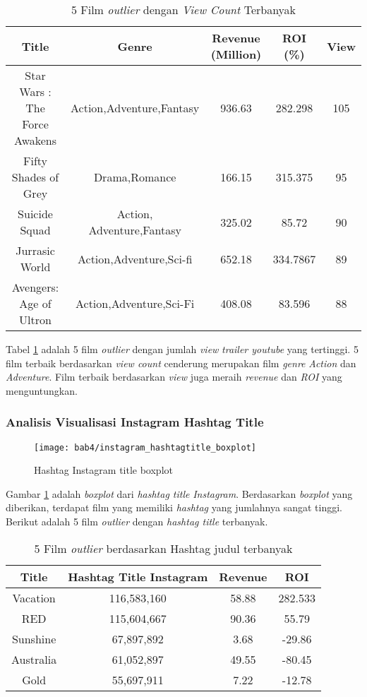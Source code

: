 \begin{table}[H]
\caption{5 Film \textit{outlier} dengan \textit{View Count} Terbanyak}
\centering
\begin{tabular}{|c|c|c|c|c|}
\hline 
Title & Genre & Revenue (Million) & ROI (\%) & View\\ 
\hline 
Star Wars : The Force Awakens  & Action,Adventure,Fantasy & 936.63 & 282.298 & 105 \\ 
\hline 
Fifty Shades of Grey & Drama,Romance & 166.15 & 315.375 & 	95 \\ 
\hline 
Suicide Squad & Action, Adventure,Fantasy & 325.02 & 85.72 &90 \\ 
\hline 
Jurrasic World & Action,Adventure,Sci-fi & 652.18 & 334.7867 &89 \\ 
\hline 
Avengers: Age of Ultron & Action,Adventure,Sci-Fi & 408.08 & 83.596 &88\\ 
\hline 
\end{tabular} 
\label{tab:5film_viewcountterbaik}
\end{table}
%
Tabel \ref{tab:5film_viewcountterbaik} adalah 5 film \textit{outlier} dengan jumlah \textit{view} \textit{trailer youtube} yang tertinggi. 5 film terbaik berdasarkan \textit{view count} cenderung merupakan film \textit{genre} \textit{Action} dan \textit{Adventure}. Film terbaik berdasarkan \textit{view} juga meraih \textit{revenue} dan \textit{ROI} yang menguntungkan.

\subsubsection{Analisis Visualisasi Instagram Hashtag Title}

\begin{figure}[H]
	\centering  
	\texttt{[image: bab4/instagram\_hashtagtitle\_boxplot]}   
	\caption{Hashtag Instagram title boxplot }
	\label{fig:instagram_hashtagtitle_boxplot} 
\end{figure} 

Gambar \ref{fig:instagram_hashtagtitle_boxplot} adalah \textit{boxplot} dari \textit{hashtag title} \textit{Instagram}. Berdasarkan \textit{boxplot} yang diberikan, terdapat film yang memiliki \textit{hashtag} yang jumlahnya sangat tinggi. Berikut adalah 5 film \textit{outlier} dengan \textit{hashtag title} terbanyak.

\begin{table}[H]
\caption{5 Film \textit{outlier} berdasarkan Hashtag judul terbanyak}
\centering
\begin{tabular}{|c|c|c|c|}
\hline 
Title & Hashtag Title Instagram & Revenue & ROI \\ 
\hline 
Vacation & 116,583,160 & 58.88 & 282.533 \\ 
\hline 
RED & 115,604,667 & 90.36 & 55.79 \\ 
\hline 
Sunshine & 67,897,892 & 3.68 & -29.86 \\ 
\hline 
Australia & 61,052,897 & 49.55 & -80.45 \\ 
\hline 
Gold & 55,697,911 & 7.22 & -12.78 \\ 
\hline 
\end{tabular} 
\label{tab:5film_hashtagtitleterbanyak}
\end{table}

